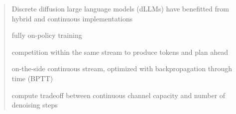 \begin{abstract}
Discrete diffusion large language models (dLLMs) have benefitted from hybrid and continuous implementations

fully on-policy training

competition within the same stream to produce tokens and plan ahead

on-the-side continuous stream, optimized with backpropagation through time (BPTT)

compute tradeoff between continuous channel capacity and number of denoising steps
\end{abstract}
